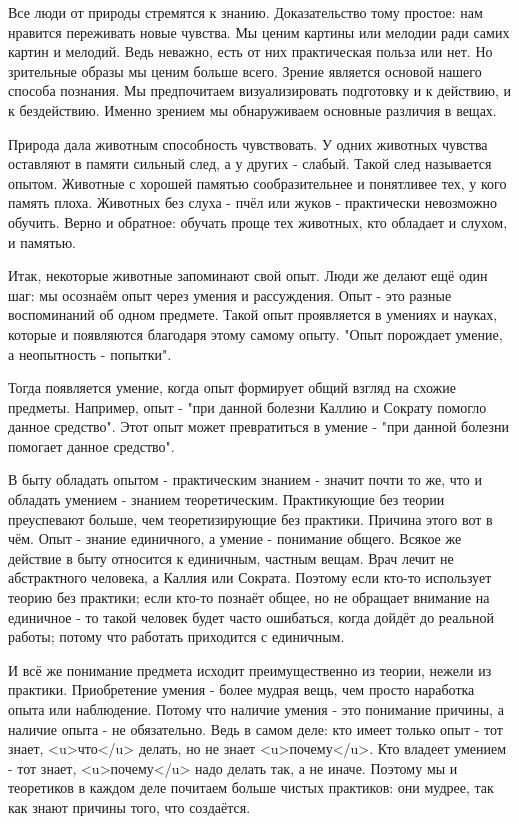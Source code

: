 \documentclass{article}
\begin{document}
Все люди от природы стремятся к знанию. Доказательство тому простое: нам нравится переживать новые чувства. Мы ценим картины или мелодии ради самих картин и мелодий. Ведь неважно, есть от них практическая польза или нет. Но зрительные образы мы ценим больше всего. Зрение является основой нашего способа познания. Мы предпочитаем визуализировать подготовку и к действию, и к бездействию. Именно зрением мы обнаруживаем основные различия в вещах.

Природа дала животным способность чувствовать. У одних животных чувства оставляют в памяти сильный след, а у других - слабый. Такой след называется опытом. Животные с хорошей памятью сообразительнее и понятливее тех, у кого память плоха. Животных без слуха - пчёл или жуков - практически невозможно обучить. Верно и обратное: обучать проще тех животных, кто обладает и слухом, и памятью.

Итак, некоторые животные запоминают свой опыт. Люди же делают ещё один шаг: мы осознаём опыт через умения
\footnotemark[1]
и рассуждения. Опыт - это разные воспоминаний об одном предмете. Такой опыт проявляется в умениях и науках, которые и появляются благодаря этому самому опыту. "Опыт порождает умение, а неопытность - попытки".
\footnotemark[2]


Тогда появляется умение, когда опыт формирует общий взгляд на схожие предметы. Например, опыт - "при данной болезни Каллию и Сократу помогло данное средство". Этот опыт может превратиться в умение - "при данной болезни помогает данное средство".

В быту обладать опытом - практическим знанием - значит почти то же, что и обладать умением - знанием теоретическим. Практикующие без теории преуспевают больше, чем теоретизирующие без практики. Причина этого вот в чём. Опыт - знание единичного, а умение - понимание общего. Всякое же действие в быту относится к единичным, частным вещам. Врач лечит не абстрактного человека, а Каллия или Сократа. Поэтому если кто-то использует теорию без практики; если кто-то познаёт общее, но не обращает внимание на единичное - то такой человек будет часто ошибаться, когда дойдёт до реальной работы; потому что работать приходится с единичным.

И всё же понимание предмета исходит преимущественно из теории, нежели из практики. Приобретение умения - более мудрая вещь, чем просто наработка опыта или наблюдение. Потому что наличие умения - это понимание причины, а наличие опыта - не обязательно. Ведь в самом деле: кто имеет только опыт - тот знает, <u>что</u> делать, но не знает <u>почему</u>. Кто владеет умением - тот знает, <u>почему</u> надо делать так, а не иначе. Поэтому мы и теоретиков в каждом деле почитаем больше чистых практиков: они мудрее, так как знают причины того, что создаётся.
\end{document}
